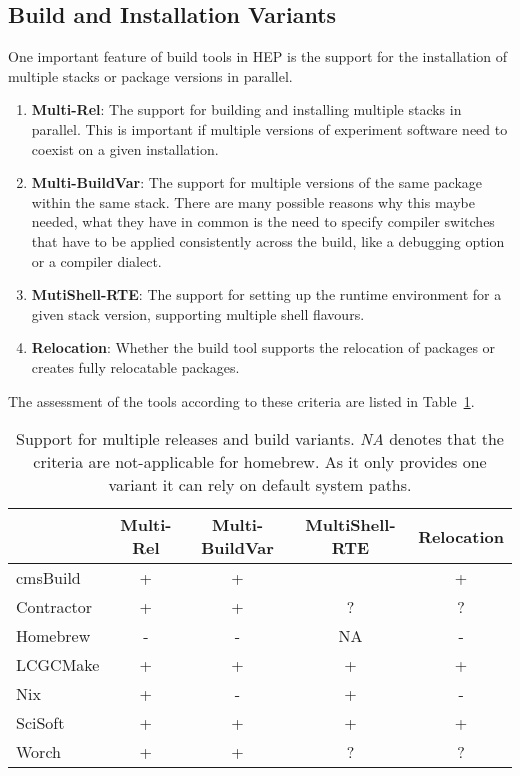 \documentclass[12pt,a4paper]{article}
\begin{document}
\subsection{Build and Installation Variants}
One important feature of build tools in HEP is the support for the installation of multiple stacks or package versions in parallel. 
\begin{enumerate}
\item \textbf{Multi-Rel}: The support for building and installing multiple stacks in parallel. This is important if multiple versions of experiment software need to coexist on a given installation.
\item \textbf{Multi-BuildVar}: The support for multiple versions of the same package within the same stack. There are many possible reasons why this maybe needed, what they have in common is the need to specify compiler switches that have to be applied consistently across the build, like a debugging option or a compiler dialect.
\item \textbf{MutiShell-RTE}: The support for setting up the runtime environment for a given stack version, supporting multiple shell flavours.
\item \textbf{Relocation}: Whether the build tool supports the relocation of packages or creates fully relocatable packages.
\end{enumerate}

The assessment of the tools according to these criteria are listed in Table~\ref{tab:taxonomyVariants}.

\begin{table}
\centering
\begin{tabular}{lcccc}
&Multi-Rel & Multi-BuildVar & MultiShell-RTE & Relocation \\ \hline
cmsBuild & \cellcolor{green} +  & \cellcolor{green} + & \cellcolor{green} & \cellcolor{green} + \\
Contractor & \cellcolor{green} + & \cellcolor{green} + & ? & ? \\
Homebrew &  \cellcolor{red} - & \cellcolor{red} -   & \cellcolor{yellow} NA   & \cellcolor{red} -  \\
LCGCMake & \cellcolor{green} + & \cellcolor{green} + & \cellcolor{green} + & \cellcolor{green} +\\
Nix & \cellcolor{green} + & \cellcolor{red} - & \cellcolor{green} +  & \cellcolor{red} -\\
SciSoft &  \cellcolor{green} + & \cellcolor{green} + &  \cellcolor{green} + & \cellcolor{green} + \\
Worch &  \cellcolor{green} + &  \cellcolor{green}  + & ? & ?
\end{tabular}
\caption{\label{tab:taxonomyVariants}Support for multiple releases and build variants. \emph{NA} denotes that the criteria are not-applicable for homebrew. As it only provides one variant it can rely on default system paths.}
\end{table}
\end{document}
